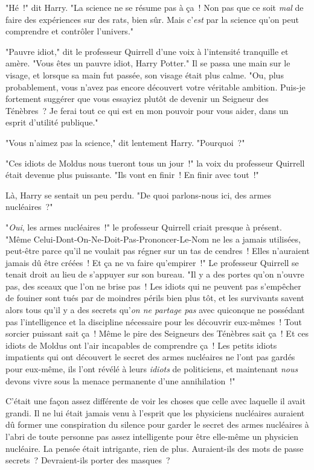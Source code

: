 "Hé~!" dit Harry. "La science ne se résume pas à ça~! Non pas que ce soit \emph{mal} de faire des expériences sur des rats, bien sûr. Mais c'\emph{est} par la science qu'on peut comprendre et contrôler l'univers."

"Pauvre idiot," dit le professeur Quirrell d'une voix à l'intensité tranquille et amère. "Vous êtes un pauvre idiot, Harry Potter." Il se passa une main sur le visage, et lorsque sa main fut passée, son visage était plus calme. "Ou, plus probablement, vous n'avez pas encore découvert votre véritable ambition. Puis-je fortement suggérer que vous essayiez plutôt de devenir un Seigneur des Ténèbres~? Je ferai tout ce qui est en mon pouvoir pour vous aider, dans un esprit d'utilité publique."

"Vous n'aimez pas la science," dit lentement Harry. "Pourquoi~?"

"Ces idiots de Moldus nous tueront tous un jour~!" la voix du professeur Quirrell était devenue plus puissante. "Ils vont en finir~! En finir avec tout~!"

Là, Harry se sentait un peu perdu. "De quoi parlons-nous ici, des armes nucléaires~?"

"\emph{Oui}, les armes nucléaires~!" le professeur Quirrell criait presque à présent. "Même Celui-Dont-On-Ne-Doit-Pas-Prononcer-Le-Nom ne les a jamais utilisées, peut-être parce qu'il ne voulait pas régner sur un tas de cendres~! Elles n'auraient jamais dû être créées~! Et ça ne va faire qu'empirer~!" Le professeur Quirrell se tenait droit au lieu de s'appuyer sur son bureau. "Il y a des portes qu'on n'ouvre pas, des sceaux que l'on ne brise pas~! Les idiots qui ne peuvent pas s'empêcher de fouiner sont tués par de moindres périls bien plus tôt, et les survivants savent alors tous qu'il y a des secrets qu'\emph{on ne partage pas} avec quiconque ne possédant pas l'intelligence et la discipline nécessaire pour les découvrir eux-mêmes~! Tout sorcier puissant sait ça~! Même le pire des Seigneurs des Ténèbres sait ça~! Et ces idiots de Moldus ont l'air incapables de comprendre ça~! Les petits idiots impatients qui ont découvert le secret des armes nucléaires ne l'ont pas gardés pour eux-même, ils l'ont révélé à leurs \emph{idiots} de politiciens, et maintenant \emph{nous} devons vivre sous la menace permanente d'une annihilation~!"

C'était une façon assez différente de voir les choses que celle avec laquelle il avait grandi. Il ne lui était jamais venu à l'esprit que les physiciens nucléaires auraient dû former une conspiration du silence pour garder le secret des armes nucléaires à l'abri de toute personne pas assez intelligente pour être elle-même un physicien nucléaire. La pensée était intrigante, rien de plus. Auraient-ils des mots de passe secrets~? Devraient-ils porter des masques~?

